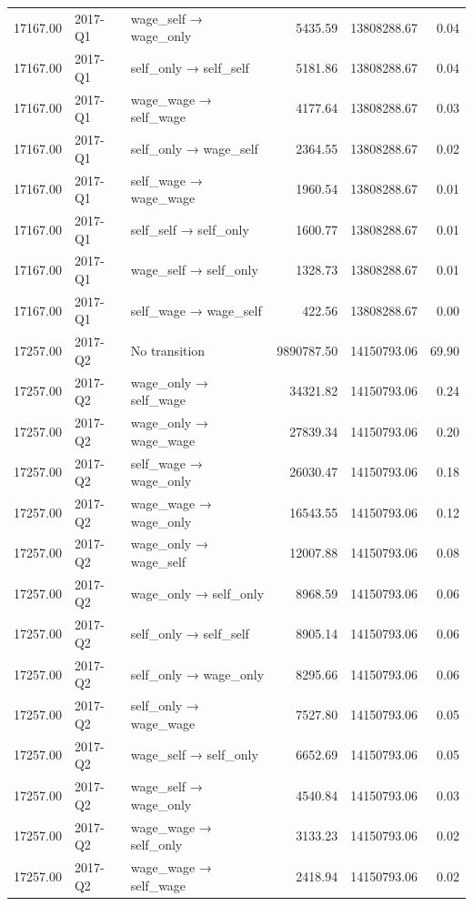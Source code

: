 \begin{table}[ht]
{\begin{tabular}{rllrrr}
  17167.00 & 2017-Q1 & wage\_self → wage\_only & 5435.59 & 13808288.67 & 0.04 \\ 
  17167.00 & 2017-Q1 & self\_only → self\_self & 5181.86 & 13808288.67 & 0.04 \\ 
  17167.00 & 2017-Q1 & wage\_wage → self\_wage & 4177.64 & 13808288.67 & 0.03 \\ 
  17167.00 & 2017-Q1 & self\_only → wage\_self & 2364.55 & 13808288.67 & 0.02 \\ 
  17167.00 & 2017-Q1 & self\_wage → wage\_wage & 1960.54 & 13808288.67 & 0.01 \\ 
  17167.00 & 2017-Q1 & self\_self → self\_only & 1600.77 & 13808288.67 & 0.01 \\ 
  17167.00 & 2017-Q1 & wage\_self → self\_only & 1328.73 & 13808288.67 & 0.01 \\ 
  17167.00 & 2017-Q1 & self\_wage → wage\_self & 422.56 & 13808288.67 & 0.00 \\ 
  17257.00 & 2017-Q2 & No transition & 9890787.50 & 14150793.06 & 69.90 \\ 
  17257.00 & 2017-Q2 & wage\_only → self\_wage & 34321.82 & 14150793.06 & 0.24 \\ 
  17257.00 & 2017-Q2 & wage\_only → wage\_wage & 27839.34 & 14150793.06 & 0.20 \\ 
  17257.00 & 2017-Q2 & self\_wage → wage\_only & 26030.47 & 14150793.06 & 0.18 \\ 
  17257.00 & 2017-Q2 & wage\_wage → wage\_only & 16543.55 & 14150793.06 & 0.12 \\ 
  17257.00 & 2017-Q2 & wage\_only → wage\_self & 12007.88 & 14150793.06 & 0.08 \\ 
  17257.00 & 2017-Q2 & wage\_only → self\_only & 8968.59 & 14150793.06 & 0.06 \\ 
  17257.00 & 2017-Q2 & self\_only → self\_self & 8905.14 & 14150793.06 & 0.06 \\ 
  17257.00 & 2017-Q2 & self\_only → wage\_only & 8295.66 & 14150793.06 & 0.06 \\ 
  17257.00 & 2017-Q2 & self\_only → wage\_wage & 7527.80 & 14150793.06 & 0.05 \\ 
  17257.00 & 2017-Q2 & wage\_self → self\_only & 6652.69 & 14150793.06 & 0.05 \\ 
  17257.00 & 2017-Q2 & wage\_self → wage\_only & 4540.84 & 14150793.06 & 0.03 \\ 
  17257.00 & 2017-Q2 & wage\_wage → self\_only & 3133.23 & 14150793.06 & 0.02 \\ 
  17257.00 & 2017-Q2 & wage\_wage → self\_wage & 2418.94 & 14150793.06 & 0.02 \\ 

\end{tabular}}
\end{table}
